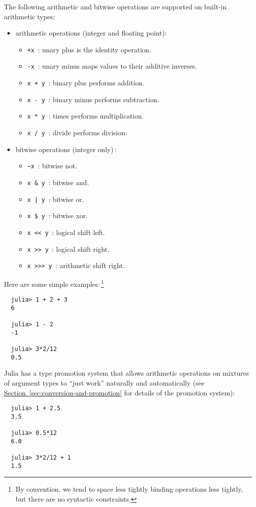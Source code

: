 \documentclass{article}
\newcommand{\Section}[1]{\hyperref[sec:#1]{Section~\ref*{sec:#1}}}
\begin{document}
The following arithmetic and bitwise operations are supported on built-in arithmetic types:
\begin{itemize}
  \item arithmetic operations (integer and floating point):
  \begin{itemize}
    \item \verb|+x|~: unary plus is the identity operation.
    \item \verb|-x|~: unary minus maps values to their additive inverses.
    \item \verb|x + y|~: binary plus performs addition.
    \item \verb|x - y|~: binary minus performs subtraction.
    \item \verb|x * y|~: times performs multiplication.
    \item \verb|x / y|~: divide performs division.
  \end{itemize}
  \item bitwise operations (integer only)\,:
  \begin{itemize}
    \item \verb|~x|~: bitwise not.
    \item \verb|x & y|~: bitwise and.
    \item \texttt{x | y}~: bitwise or.
    \item \verb|x $ y|~: bitwise xor.
    \item \verb|x << y|~: logical shift left.
    \item \verb|x >> y|~: logical shift right.
    \item \verb|x >>> y|~: arithmetic shift right.
  \end{itemize}
\end{itemize}
Here are some simple examples:\,\footnote{By convention, we tend to space less tightly binding operations less tightly, but there are no syntactic constraints.}
\begin{verbatim}
  julia> 1 + 2 + 3
  6

  julia> 1 - 2
  -1

  julia> 3*2/12
  0.5
\end{verbatim}
Julia has a type promotion system that allows arithmetic operations on mixtures of argument types to ``just work'' naturally and automatically (see \Section{conversion-and-promotion} for details of the promotion system):
\begin{verbatim}
  julia> 1 + 2.5
  3.5

  julia> 0.5*12
  6.0

  julia> 3*2/12 + 1
  1.5
\end{verbatim}
\end{document}
